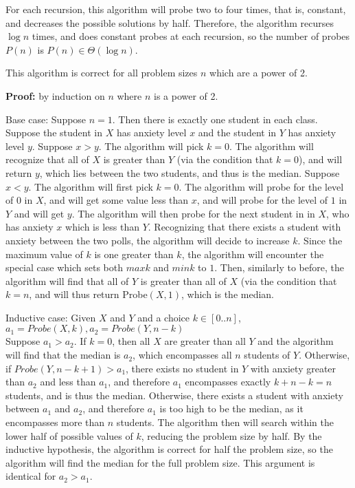 \documentclass[11pt]{article}
\begin{document}
For each recursion, this algorithm will probe two to four times, that is, constant, and decreases the possible solutions by half. Therefore, the algorithm recurses $\log n$ times, and does constant probes at each recursion, so the number of probes $P(n)$ is $P(n) \in \Theta(\log n)$.

This algorithm is correct for all problem sizes $n$ which are a power of 2. 

\textbf{Proof: } by induction on $n$ where $n$ is a power of 2. 

Base case: 
Suppose $n=1$. Then there is exactly one student in each class. Suppose the student in $X$ has anxiety level $x$ and the student in $Y$ has anxiety level $y$. Suppose $x > y$. The algorithm will pick $k = 0$. The algorithm will recognize that all of $X$ is greater than $Y$ (via the condition that $k=0$), and will return $y$, which lies between the two students, and thus is the median. 
Suppose $x < y$. The algorithm will first pick $k=0$. The algorithm will probe for the level of $0$ in $X$, and will get some value less than $x$, and will probe for the level of $1$ in $Y$ and will get $y$. The algorithm will then probe for the next student in in $X$, who has anxiety $x$ which is less than $Y$. Recognizing that there exists a student with anxiety between the two polls, the algorithm will decide to increase $k$. Since the maximum value of $k$ is one greater than $k$, the algorithm will encounter the special case which sets both $maxk$ and $mink$ to $1$. Then, similarly to before, the algorithm will find that all of $Y$ is greater than all of $X$ (via the condition that $k = n$, and will thus return Probe$(X, 1)$, which is the median.


Inductive case:
Given $X$ and $Y$ and a choice $k \in [0..n]$, $a_1 = Probe(X, k), a_2 = Probe(Y, n-k)$ \\ 
Suppose $a_1 > a_2$. If $k = 0$, then all $X$ are greater than all $Y$ and the algorithm will find that the median is $a_2$, which encompasses all $n$ students of $Y$. Otherwise, if $Probe(Y, n-k+1) > a_1$, there exists no student in $Y$ with anxiety greater than $a_2$ and less than $a_1$, and therefore $a_1$ encompasses exactly $k + n - k = n$ students, and is thus the median. Otherwise, there exists a student with anxiety between $a_1$ and $a_2$, and therefore $a_1$ is too high to be the median, as it encompasses more than $n$ students. The algorithm then will search within the lower half of possible values of $k$, reducing the problem size by half. By the inductive hypothesis, the algorithm is correct for half the problem size, so the algorithm will find the median for the full problem size. 
This argument is identical for $a_2 > a_1$. 
\end{document}
